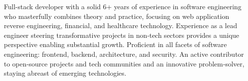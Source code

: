

\begin{cvparagraph}

Full-stack developer with a solid 6+ years of experience in software engineering who masterfully combines theory and practice, focusing on web application reverse engineering, financial, and healthcare technology. Experience as a lead engineer steering transformative projects in non‑tech sectors provides a unique perspective enabling substantial growth. Proficient in all facets of software engineering: frontend, backend, architecture, and security. An active contributor to open‑source projects and tech communities and an innovative problem‑solver, staying abreast of emerging technologies.
\end{cvparagraph}
